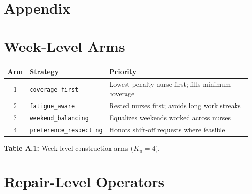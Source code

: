 \documentclass{article}
\begin{document}
\clearpage




\clearpage

\section*{Appendix}

\appendix

\section{Week-Level Arms}
\label{app:week-arms}

\begin{center}
\small
\begin{tabular}{cll}
\toprule
Arm & Strategy & Priority \\
\midrule
1 & \texttt{coverage\_first}        & Lowest-penalty nurse first; fills minimum coverage \\
2 & \texttt{fatigue\_aware}         & Rested nurses first; avoids long work streaks \\
3 & \texttt{weekend\_balancing}     & Equalizes weekends worked across nurses \\
4 & \texttt{preference\_respecting} & Honors shift-off requests where feasible \\
\bottomrule
\end{tabular}
\end{center}
\begin{center}
\small\textbf{Table A.1:} Week-level construction arms ($K_w = 4$).
\end{center}

\section{Repair-Level Operators}
\label{app:repair-arms}
\end{document}
